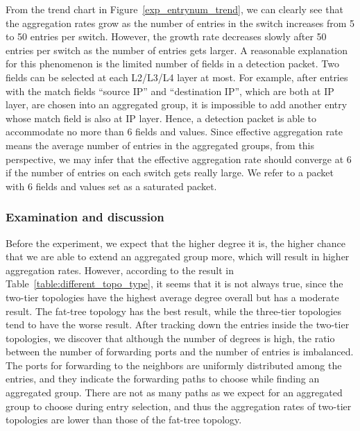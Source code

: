 \documentclass[conference]{IEEEtran}
\begin{document}
From the trend chart in Figure~\ref{exp_entrynum_trend}, we can clearly see that the aggregation rates grow as the number of entries in the switch increases from 5 to 50 entries per switch. However, the growth rate decreases slowly after 50 entries per switch as the number of entries gets larger. A reasonable explanation for this phenomenon is the limited number of fields in a detection packet. Two fields can be selected at each L2/L3/L4 layer at most. For example, after entries with the match fields ``source IP'' and ``destination IP'', which are both at IP layer, are chosen into an aggregated group, it is impossible to add another entry whose match field is also at IP layer. Hence, a detection packet is able to accommodate no more than 6 fields and values. Since effective aggregation rate means the average number of entries in the aggregated groups, from this perspective, we may infer that the effective aggregation rate should converge at 6 if the number of entries on each switch gets really large. We refer to a packet with 6 fields and values set as a saturated packet.


\subsubsection{Examination and discussion}
\label{examination_and_discussion}

Before the experiment, we expect that the higher degree it is, the higher chance that we are able to extend an aggregated group more, which will result in higher aggregation rates. However, according to the result in Table~\ref{table:different_topo_type}, it seems that it is not always true, since the two-tier topologies have the highest average degree overall but has a moderate result. The fat-tree topology has the best result, while the three-tier topologies tend to have the worse result. After tracking down the entries inside the two-tier topologies, we discover that although the number of degrees is high, the ratio between the number of forwarding ports and the number of entries is imbalanced. The ports for forwarding to the neighbors are uniformly distributed among the entries, and they indicate the forwarding paths to choose while finding an aggregated group. There are not as many paths as we expect for an aggregated group to choose during entry selection, and thus the aggregation rates of two-tier topologies are lower than those of the fat-tree topology. 
\end{document}
